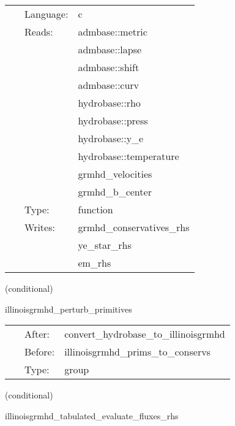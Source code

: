 \documentclass{article}
\begin{document}
 \begin{tabular*}{160mm}{cll} 
~ & Language:  & c \\ 
~ & Reads:  & admbase::metric \\ 
~& ~ &admbase::lapse\\ 
~& ~ &admbase::shift\\ 
~& ~ &admbase::curv\\ 
~& ~ &hydrobase::rho\\ 
~& ~ &hydrobase::press\\ 
~& ~ &hydrobase::y\_e\\ 
~& ~ &hydrobase::temperature\\ 
~& ~ &grmhd\_velocities\\ 
~& ~ &grmhd\_b\_center\\ 
~ & Type:  & function \\ 
~ & Writes:  & grmhd\_conservatives\_rhs \\ 
~& ~ &ye\_star\_rhs\\ 
~& ~ &em\_rhs\\ 
\end{tabular*} 


\vspace{5mm}

   (conditional) 

\hspace{5mm} illinoisgrmhd\_perturb\_primitives 

\hspace{5mm}{\it perturb initial primitive data } 


\hspace{5mm}

 \begin{tabular*}{160mm}{cll} 
~ & After:  & convert\_hydrobase\_to\_illinoisgrmhd \\ 
~ & Before:  & illinoisgrmhd\_prims\_to\_conservs \\ 
~ & Type:  & group \\ 
\end{tabular*} 


\vspace{5mm}

   (conditional) 

\hspace{5mm} illinoisgrmhd\_tabulated\_evaluate\_fluxes\_rhs 

\hspace{5mm}{\it tabulated version of illinoisgrmhd\_evaluate\_fluxes\_rhs } 
\end{document}
